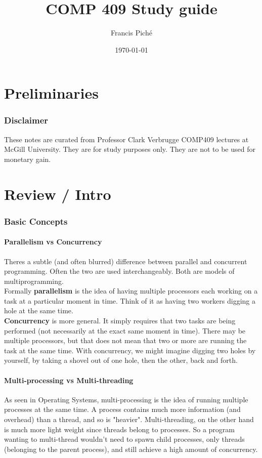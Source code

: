 \documentclass[12pt]{article}
\theoremstyle{definition}
\begin{document}
\title{COMP 409 Study guide}
\author{Francis Pich\'e}
\date{\today}
\maketitle
\newpage
\tableofcontents
\newpage

\part{Preliminaries}
\section{Disclaimer}
These notes are curated from Professor Clark Verbrugge COMP409 lectures at McGill University. They are for study purposes only. They are not to be used for monetary gain.

\part{Review / Intro}
\section{Basic Concepts}
\subsection{Parallelism vs Concurrency}
Theres a subtle (and often blurred) difference between parallel and concurrent programming. Often the two are used interchangeably. Both are models of multiprogramming.
\\ \linebreak
Formally \textbf{parallelism} is the idea of having multiple processors each working on a task at a particular moment in time. Think of it as having two workers digging a hole at the same time.
\\ \linebreak
\textbf{Concurrency} is more general. It simply requires that two tasks are being performed (not necessarily at the exact same moment in time). There may be multiple processors, but that does not mean that two or more are running the task at the same time. With concurrency, we might imagine digging two holes by yourself, by taking a shovel out of one hole, then the other, back and forth.
\\ \linebreak

\subsection{Multi-processing vs Multi-threading}
As seen in Operating Systems, multi-processing is the idea of running multiple processes at the same time. A process contains much more information (and overhead) than a thread, and so is "heavier". Multi-threading, on the other hand is much more light weight since threads belong to processes. So a program wanting to multi-thread wouldn't need to spawn child processes, only threads (belonging to the parent process), and still achieve a high amount of concurrency.
\\ \linebreak
\end{document}

